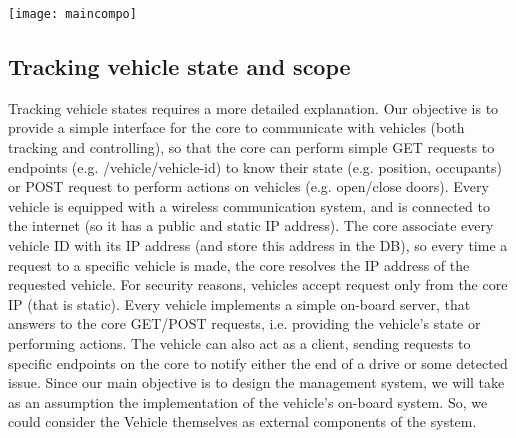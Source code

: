 \texttt{[image: maincompo]}
\newpage
\subsection{Tracking vehicle state and scope}
Tracking vehicle states requires a more detailed explanation. Our objective is to provide a simple interface for the core to communicate with vehicles (both tracking and controlling), so that the core can perform simple GET requests to endpoints (e.g. /vehicle/vehicle-id) to know their state (e.g. position, occupants) or POST request to perform actions on vehicles (e.g. open/close doors). Every vehicle is equipped with a wireless communication system, and is connected to the internet (so it has a public and static IP address). The core associate every vehicle ID with its IP address (and store this address in the DB), so every time a request to a specific vehicle is made, the core resolves the IP address of the requested vehicle. For security reasons, vehicles accept request only from the core IP (that is static). Every vehicle implements a simple on-board server, that answers to the core GET/POST requests, i.e. providing the vehicle's state or performing actions.
The vehicle can also act as a client, sending requests to specific endpoints on the core to notify either the end of a drive or some detected issue. 
Since our main objective is to design the management system, we will take as an assumption the implementation of the vehicle's on-board system. So, we could consider the Vehicle themselves as external components of the system.
\newpage
